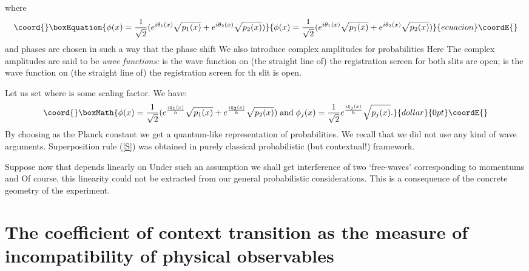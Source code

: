 \documentclass[12pt,oneside,final,a4paper]{article}
\begin{document}
where 
\begin{equation}\coord{}\boxEquation{
\label{S}
\phi(x)= \frac{1}{\sqrt{2}} (e^{i \theta_1(x)}\sqrt{p_1(x)} + 
e^{i \theta_2(x)}\sqrt{p_2(x)})
}{
\phi(x)= \frac{1}{\sqrt{2}} (e^{i \theta_1(x)}\sqrt{p_1(x)} + 
e^{i \theta_2(x)}\sqrt{p_2(x)})
}{ecuacion}\coordE{}\end{equation}
and phases \coordHE{} are chosen in such a way that the phase shift
\coordHE{} We also introduce  complex amplitudes
for probabilities \coordHE{}
Here \coordHE{} The complex amplitudes are 
said to be {\it wave functions:}  \coordHE{} is the wave function on (the straight
line of) the registration screen for both slits are open;
\coordHE{} is the wave function on (the straight
line of) the registration screen for \coordHE{}th slit  is open.

Let us set \coordHE{} where \coordHE{} is some scaling factor.
We have:
$$\coord{}\boxMath{
\phi(x)= \frac{1}{\sqrt{2}} (e^{\frac{i \xi_1(x)}{h}}\sqrt{p_1(x)} + 
e^{\frac{i \xi_2(x)}{h}}\sqrt{p_2(x)})\; \mbox{and}\; 
\phi_j(x)= \frac{1}{\sqrt{2}} e^{\frac{i \xi_j(x)}{h}}\sqrt{p_j(x)}.
}{dollar}{0pt}\coordE{}$$
By choosing \coordHE{} as the Planck constant we get a quantum-like representation
of probabilities. We recall that we did not use any kind of wave arguments.
Superposition rule (\ref{S}) was obtained in purely classical probabilistic
(but contextual!) framework.

Suppose now that \myHighlight{$\xi$}\coordHE{} depends linearly on \coordHE{} Under such an assumption we shall get interference
of two `free-waves' corresponding to momentums \coordHE{} and \coordHE{} Of course, this
linearity could not be extracted from  our general probabilistic considerations. This is a
consequence of the concrete geometry of the experiment.

\section{The coefficient of context transition as the measure of incompatibility of physical
observables}
\end{document}
